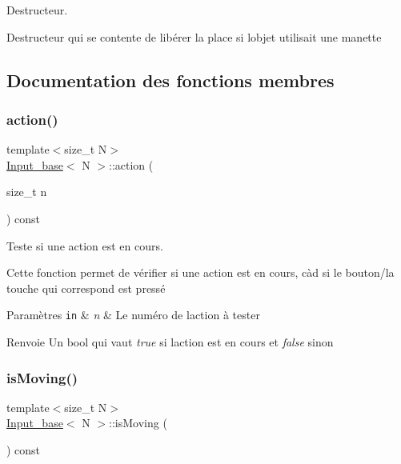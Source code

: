 Destructeur. 

Destructeur qui se contente de libérer la place si l\textquotesingle{}objet utilisait une manette 

\subsection{Documentation des fonctions membres}
\mbox{\label{class_input__base_a2ac741377832fd670954dba5abf82a10}} 
\subsubsection{\texorpdfstring{action()}{action()}}
{\footnotesize\ttfamily template$<$size\+\_\+t N$>$ \\
\hyperlink{class_input__base}{Input\+\_\+base}$<$ N $>$\+::action (\begin{DoxyParamCaption}\item[{size\+\_\+t}]{n }\end{DoxyParamCaption}) const}



Teste si une action est en cours. 

Cette fonction permet de vérifier si une action est en cours, càd si le bouton/la touche qui correspond est pressé 
\begin{DoxyParams}[1]{Paramètres}
\mbox{\tt in}  & {\em n} & Le numéro de l\textquotesingle{}action à tester \\
\hline
\end{DoxyParams}
\begin{DoxyReturn}{Renvoie}
Un {\ttfamily bool} qui vaut {\itshape true} si l\textquotesingle{}action est en cours et {\itshape false} sinon 
\end{DoxyReturn}
\mbox{\label{class_input__base_a895ecc7012d6ccdd4284de7d613f2ed2}} 
\subsubsection{\texorpdfstring{is\+Moving()}{isMoving()}}
{\footnotesize\ttfamily template$<$size\+\_\+t N$>$ \\
\hyperlink{class_input__base}{Input\+\_\+base}$<$ N $>$\+::is\+Moving (\begin{DoxyParamCaption}{ }\end{DoxyParamCaption}) const}



